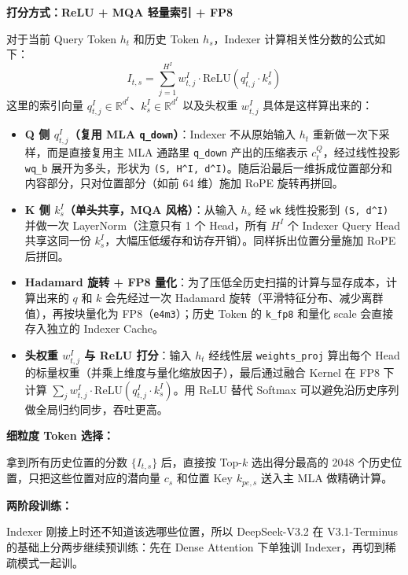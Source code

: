 \documentclass[11pt]{article}
\begin{document}
\textbf{打分方式：ReLU + MQA 轻量索引 + FP8}

对于当前 Query Token $h_t$ 和历史 Token $h_s$，Indexer 计算相关性分数的公式如下：
\[
  I_{t,s} = \sum_{j=1}^{H^I} w_{t,j}^I \cdot \text{ReLU}\left(q_{t,j}^I \cdot k_s^I\right)
\]
这里的索引向量 $q_{t,j}^I \in \mathbb{R}^{d^I}$、$k_s^I \in \mathbb{R}^{d^I}$ 以及头权重 $w_{t,j}^I$ 具体是这样算出来的：

\begin{itemize}
  \item \textbf{Q 侧 $q_{t,j}^I$（复用 MLA \texttt{q\_down}）}：Indexer 不从原始输入 $h_t$ 重新做一次下采样，而是直接复用主 MLA 通路里 \texttt{q\_down} 产出的压缩表示 $c_t^Q$，经过线性投影 \texttt{wq\_b} 展开为多头，形状为 \texttt{(S, H\textasciicircum I, d\textasciicircum I)}。随后沿最后一维拆成位置部分和内容部分，只对位置部分（如前 64 维）施加 RoPE 旋转再拼回。
  \item \textbf{K 侧 $k_s^I$（单头共享，MQA 风格）}：从输入 $h_s$ 经 \texttt{wk} 线性投影到 \texttt{(S, d\textasciicircum I)} 并做一次 LayerNorm（注意只有 1 个 Head，所有 $H^I$ 个 Indexer Query Head 共享这同一份 $k_s^I$，大幅压低缓存和访存开销）。同样拆出位置分量施加 RoPE 后拼回。
  \item \textbf{Hadamard 旋转 + FP8 量化}：为了压低全历史扫描的计算与显存成本，计算出来的 $q$ 和 $k$ 会先经过一次 Hadamard 旋转（平滑特征分布、减少离群值），再按块量化为 FP8（\texttt{e4m3}）；历史 Token 的 \texttt{k\_fp8} 和量化 scale 会直接存入独立的 Indexer Cache。
  \item \textbf{头权重 $w_{t,j}^I$ 与 ReLU 打分}：输入 $h_t$ 经线性层 \texttt{weights\_proj} 算出每个 Head 的标量权重（并乘上维度与量化缩放因子），最后通过融合 Kernel 在 FP8 下计算 $\sum_j w_{t,j}^I \cdot \text{ReLU}(q_{t,j}^I \cdot k_s^I)$。用 ReLU 替代 Softmax 可以避免沿历史序列做全局归约同步，吞吐更高。
\end{itemize}

\textbf{细粒度 Token 选择：}

拿到所有历史位置的分数 $\{I_{t,s}\}$ 后，直接按 Top-$k$ 选出得分最高的 2048 个历史位置，只把这些位置对应的潜向量 $c_s$ 和位置 Key $k_{pe,s}$ 送入主 MLA 做精确计算。

\textbf{两阶段训练：}

Indexer 刚接上时还不知道该选哪些位置，所以 DeepSeek-V3.2 在 V3.1-Terminus 的基础上分两步继续预训练：先在 Dense Attention 下单独训 Indexer，再切到稀疏模式一起训。
\end{document}
